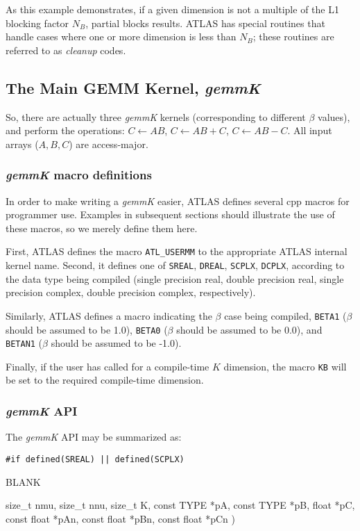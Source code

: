 \documentclass[11pt]{article}
\newenvironment{routdef}[1]
{
   \begin{list}{BLANK}
   {
      \setlength{\parsep}{0in}
      \setlength{\itemsep}{.01in}
      \setlength{\partopsep}{0in}
      \setlength{\topsep}{0.1in}
      \setlength{\labelsep}{0in}
      \setlength{\labelwidth}{#1in}
      \setlength{\leftmargin}{#1in}
   }
} {\end{list}}
\newcommand{\rditem}[2]{\item[#1\hfill(~]#2 )}
\begin{document}
As this example demonstrates, if a given dimension is not a multiple of
the L1 blocking factor $N_B$, partial blocks results.  ATLAS has special
routines that handle cases where one or more dimension is less than $N_B$;
these routines are referred to as {\em cleanup} codes.

\subsection{The Main GEMM Kernel, {\it gemmK}}
So, there are actually three {\it gemmK} kernels (corresponding to different
$\beta$ values), and perform the operations:
$C \leftarrow A B$,
$C \leftarrow A B + C$,
$C \leftarrow A B - C$.  All input arrays ($A, B, C$) are
access-major. 

\subsubsection{{\it gemmK}  macro definitions}
In order to make writing a {\it gemmK} easier, ATLAS defines several 
cpp macros for programmer use.  Examples in subsequent sections should 
illustrate the use of these macros, so we merely define them here.

First, ATLAS defines the macro {\tt ATL\_USERMM}
to the appropriate ATLAS internal kernel name.  Second, it defines one
of  {\tt SREAL}, {\tt DREAL}, {\tt SCPLX}, {\tt DCPLX}, according to
the data type being compiled (single precision real, double precision
real, single precision complex, double precision complex, respectively).

Similarly, ATLAS defines a macro indicating the $\beta$ case being
compiled, {\tt BETA1} ($\beta$ should be assumed to be 1.0), {\tt BETA0}
($\beta$ should be assumed to be 0.0), and {\tt BETAN1}
($\beta$ should be assumed to be -1.0).

Finally, if the user has called for a compile-time $K$ dimension,
the macro {\tt KB} will be set to the required compile-time dimension.

\subsubsection{{\it gemmK} API}
The {\it gemmK} API may be summarized as:

\vspace*{.1in}

\noindent
\verb+#if defined(SREAL) || defined(SCPLX)+
\begin{routdef}{1.8}
\rditem{~~~void ATL\_USERMM}
{size\_t nmu, size\_t nnu, size\_t K, const TYPE *pA, const TYPE *pB, float *pC,
 const float *pAn, const float *pBn, const float *pCn}
\end{routdef}
\end{document}
